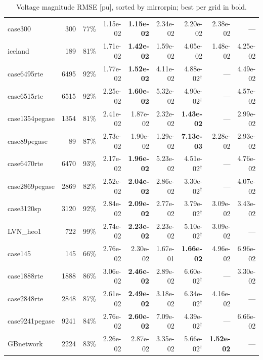 \documentclass[10pt]{article}
\begin{document}
\begin{landscape}
\begin{table}[H]
\begin{tabular}{lrr rrrrrr}
case300 & 300 & 77\% & 1.15e-02 & \textbf{1.15e-02} & 2.34e-02 & 2.20e-02 & 2.38e-02 & --- \\
iceland & 189 & 81\% & 1.71e-02 & \textbf{1.42e-02} & 1.59e-02 & 4.05e-02 & 1.48e-02 & 4.25e-02 \\
case6495rte & 6495 & 92\% & 1.77e-02 & \textbf{1.52e-02} & 4.11e-02 & 4.88e-02$^\dagger$ & --- & 4.49e-02 \\
case6515rte & 6515 & 92\% & 2.25e-02 & \textbf{1.60e-02} & 5.32e-02 & 4.90e-02$^\dagger$ & --- & 4.57e-02 \\
case1354pegase & 1354 & 81\% & 2.41e-02 & 1.87e-02 & 2.32e-02 & \textbf{1.43e-02} & --- & 2.99e-02 \\
case89pegase & 89 & 87\% & 2.73e-02 & 1.90e-02 & 1.29e-02 & \textbf{7.13e-03} & 2.28e-02 & 2.93e-02 \\
case6470rte & 6470 & 93\% & 2.17e-02 & \textbf{1.96e-02} & 5.23e-02 & 4.51e-02$^\dagger$ & --- & 4.76e-02 \\
case2869pegase & 2869 & 82\% & 2.52e-02 & \textbf{2.04e-02} & 2.86e-02 & 3.30e-02$^\dagger$ & --- & 4.07e-02 \\
case3120sp & 3120 & 92\% & 2.84e-02 & \textbf{2.09e-02} & 2.77e-02 & 3.79e-02$^\dagger$ & 3.09e-02 & 3.43e-02 \\
LVN\_heo1 & 722 & 99\% & 2.74e-02 & \textbf{2.23e-02} & 2.23e-02 & 5.10e-02$^\dagger$ & 3.09e-02 & --- \\
case145 & 145 & 66\% & 2.76e-02 & 2.30e-02 & 1.67e-01 & \textbf{1.66e-02} & 4.96e-02 & 6.96e-02 \\
case1888rte & 1888 & 86\% & 3.06e-02 & \textbf{2.46e-02} & 2.89e-02 & 6.60e-02$^\dagger$ & --- & 3.30e-02 \\
case2848rte & 2848 & 87\% & 2.61e-02 & \textbf{2.49e-02} & 3.18e-02 & 6.34e-02$^\dagger$ & 4.16e-02 & --- \\
case9241pegase & 9241 & 84\% & 2.76e-02 & \textbf{2.60e-02} & 7.09e-02 & 4.39e-02$^\dagger$ & --- & 6.66e-02 \\
GBnetwork & 2224 & 83\% & 2.26e-02 & 2.87e-02 & 3.35e-02 & 5.66e-02$^\dagger$ & \textbf{1.52e-02} & --- \\
\bottomrule
\end{tabular}
\caption{Voltage magnitude RMSE [pu], sorted by mirrorpin; best per grid in bold.}
\end{table}
\end{landscape}
\end{document}
